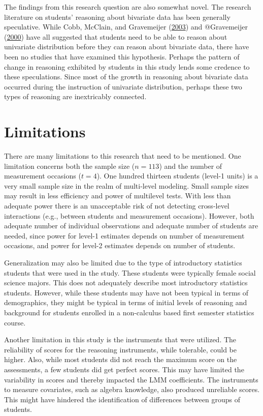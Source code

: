 \documentclass[11pt]{umnthesis}
\begin{document}
The findings from this research question are also somewhat novel. The research literature on students' reasoning about bivariate data has been generally speculative. While Cobb, McClain, and Gravemeijer (\protect\hyperlink{ref-cobb:2003a}{2003}) and @Gravemeijer (\protect\hyperlink{ref-gravemeijer:2000}{2000}) have all suggested that students need to be able to reason about univariate distribution before they can reason about bivariate data, there have been no studies that have examined this hypothesis. Perhaps the pattern of change in reasoning exhibited by students in this study lends some credence to these speculations. Since most of the growth in reasoning about bivariate data occurred during the instruction of univariate distribution, perhaps these two types of reasoning are inextricably connected.

\hypertarget{limitations}{%
\section{Limitations}\label{limitations}}

There are many limitations to this research that need to be mentioned. One limitation concerns both the sample size (\(n=113\)) and the number of measurement occasions (\(t=4\)). One hundred thirteen students (level-1 units) is a very small sample size in the realm of multi-level modeling. Small sample sizes may result in less efficiency and power of multilevel tests. With less than adequate power there is an unacceptable risk of not detecting cross-level interactions (e.g., between students and measurement occasions). However, both adequate number of individual observations and adequate number of students are needed, since power for level-1 estimates depends on number of measurement occasions, and power for level-2 estimates depends on number of students.

Generalization may also be limited due to the type of introductory statistics students that were used in the study. These students were typically female social science majors. This does not adequately describe most introductory statistics students. However, while these students may have not been typical in terms of demographics, they might be typical in terms of initial levels of reasoning and background for students enrolled in a non-calculus based first semester statistics course.

Another limitation in this study is the instruments that were utilized. The reliability of scores for the reasoning instruments, while tolerable, could be higher. Also, while most students did not reach the maximum score on the assessments, a few students did get perfect scores. This may have limited the variability in scores and thereby impacted the LMM coefficients. The instruments to measure covariates, such as algebra knowledge, also produced unreliable scores. This might have hindered the identification of differences between groups of students.
\end{document}

